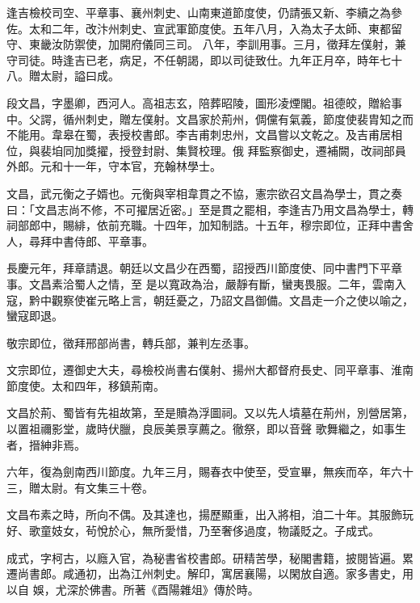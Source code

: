\begin{pinyinscope}
 逢吉檢校司空、平章事、襄州刺史、山南東道節度使，仍請張又新、李續之為參佐。太和二年，改汴州刺史、宣武軍節度使。五年八月，入為太子太師、東都留守、東畿汝防禦使，加開府儀同三司。
 八年，李訓用事。三月，徵拜左僕射，兼守司徒。時逢吉已老，病足，不任朝謁，即以司徒致仕。九年正月卒，時年七十八。贈太尉，謚曰成。



 段文昌，字墨卿，西河人。高祖志玄，陪葬昭陵，圖形凌煙閣。祖德皎，贈給事中。父諤，循州刺史，贈左僕射。文昌家於荊州，倜儻有氣義，節度使裴胄知之而不能用。韋皋在蜀，表授校書郎。李吉甫刺忠州，文昌嘗以文乾之。及吉甫居相位，與裴垍同加獎擢，授登封尉、集賢校理。俄
 拜監察御史，遷補闕，改祠部員外郎。元和十一年，守本官，充翰林學士。



 文昌，武元衡之子婿也。元衡與宰相韋貫之不協，憲宗欲召文昌為學士，貫之奏曰：「文昌志尚不修，不可擢居近密。」至是貫之罷相，李逢吉乃用文昌為學士，轉祠部郎中，賜緋，依前充職。十四年，加知制誥。十五年，穆宗即位，正拜中書舍人，尋拜中書侍郎、平章事。



 長慶元年，拜章請退。朝廷以文昌少在西蜀，詔授西川節度使、同中書門下平章事。文昌素洽蜀人之情，至
 是以寬政為治，嚴靜有斷，蠻夷畏服。二年，雲南入寇，黔中觀察使崔元略上言，朝廷憂之，乃詔文昌御備。文昌走一介之使以喻之，蠻寇即退。



 敬宗即位，徵拜邢部尚書，轉兵部，兼判左丞事。



 文宗即位，遷御史大夫，尋檢校尚書右僕射、揚州大都督府長史、同平章事、淮南節度使。太和四年，移鎮荊南。



 文昌於荊、蜀皆有先祖故第，至是贖為浮圖祠。又以先人墳墓在荊州，別營居第，以置祖禰影堂，歲時伏臘，良辰美景享薦之。徹祭，即以音聲
 歌舞繼之，如事生者，搢紳非焉。



 六年，復為劍南西川節度。九年三月，賜春衣中使至，受宣畢，無疾而卒，年六十三，贈太尉。有文集三十卷。



 文昌布素之時，所向不偶。及其達也，揚歷顯重，出入將相，洎二十年。其服飾玩好、歌童妓女，茍悅於心，無所愛惜，乃至奢侈過度，物議貶之。子成式。



 成式，字柯古，以廕入官，為秘書省校書郎。研精苦學，秘閣書籍，披閱皆遍。累遷尚書郎。咸通初，出為江州刺史。解印，寓居襄陽，以閑放自適。家多書史，用以自
 娛，尤深於佛書。所著《酉陽雜俎》傳於時。




\end{pinyinscope}

